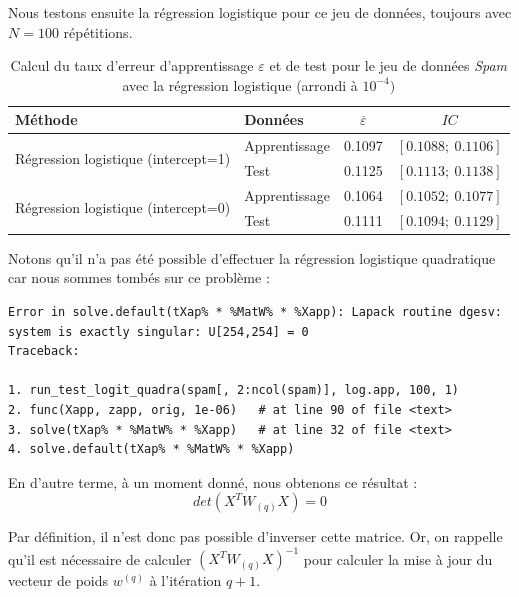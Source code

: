 \documentclass{article}
\begin{document}
Nous testons ensuite la régression logistique pour ce jeu de données, toujours avec $N=100$ répétitions.


\begin{table}[H]
\centering
\caption{Calcul du taux d'erreur d'apprentissage $\varepsilon$ et de test pour le jeu de données \textit{Spam} avec la régression logistique (arrondi à $10^{-4})$}
\begin{tabular}{l|l|cc}
\multicolumn{1}{l|}{\textbf{Méthode}}    & \textbf{Données} &$ \overline{\varepsilon}$ & $IC$                      \\ \hline
\multirow{2}{*}{Régression logistique (intercept=1)}                  & Apprentissage    & 0.1097                             & $\left[0.1088 ;~ 0.1106 \right]$  \\
                                       & Test             & 0.1125                                 & $\left[0.1113 ;~ 0.1138 \right]$ \\ \hline
\multirow{2}{*}{Régression logistique (intercept=0)}                  & Apprentissage    & 0.1064                             & $\left[0.1052 ;~ 0.1077 \right]$  \\
                                       & Test             & 0.1111                                 & $\left[0.1094 ;~ 0.1129 \right]$ \\ 
\end{tabular}

\label{spam_logit}
\end{table}

Notons qu'il n'a pas été possible d'effectuer la régression logistique quadratique car nous sommes tombés sur ce problème :
\begin{lstlisting}
Error in solve.default(tXap% * %MatW% * %Xapp): Lapack routine dgesv: system is exactly singular: U[254,254] = 0
Traceback:

1. run_test_logit_quadra(spam[, 2:ncol(spam)], log.app, 100, 1)
2. func(Xapp, zapp, orig, 1e-06)   # at line 90 of file <text>
3. solve(tXap% * %MatW% * %Xapp)   # at line 32 of file <text>
4. solve.default(tXap% * %MatW% * %Xapp)
\end{lstlisting}

En d'autre terme, à un moment donné, nous obtenons ce résultat :
\[
det(X^TW_{(q)}X)=0
\]

Par définition, il n'est donc pas possible d'inverser cette matrice. Or, on rappelle qu'il est nécessaire de calculer $(X^TW_{(q)}X)^{-1}$ pour calculer la mise à jour du vecteur de poids $w^{(q)}$ à l'itération $q+1$.
\end{document}
